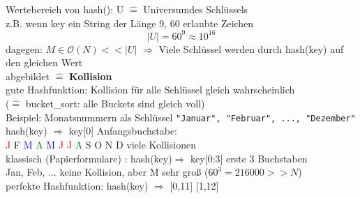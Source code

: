 \documentclass[11pt, fleqn]{scrreprt}
\newcommand{\bigO}[0]{\mathcal{O}}
\begin{document}
Wertebereich von hash(): U $\widehat{=}$ \glqq Universum\grqq des Schlüssels \\
\hspace*{5mm} z.B. wenn key ein String der Länge 9, 60 erlaubte Zeichen \\
\[ |U| = 60^9 \approx 10^{16}\]
dagegen: $M \in \bigO{}(N) << |U|$ $\Rightarrow$ Viele Schlüssel werden durch hash(key) auf den gleichen Wert\\
\hspace*{15mm} abgebildet $\widehat{=}$ \textbf{Kollision}\\
gute Hashfunktion: Kollision für alle Schlüssel gleich wahrscheinlich \\
\hspace*{15mm} ($\widehat{=}$ bucket\_sort: alle Buckets sind gleich voll) \\

Beispiel: Monatsnummern als Schlüssel \verb|"Januar", "Februar", ..., "Dezember"| \\
hash(key) $\Rightarrow$ key[0] Anfangsbuchstabe: \\

\hspace*{10mm} \textcolor{red}{J} \hspace*{5mm}  F \hspace*{5mm}  \textcolor{blue}{M} \hspace*{5mm}  \textcolor{green}{A} \hspace*{5mm}  \textcolor{blue}{M} \hspace*{5mm}  \textcolor{red}{J} \hspace*{5mm}  \textcolor{red}{J} \hspace*{5mm}  \textcolor{green}{A} \hspace*{5mm}
 S \hspace*{5mm}  O \hspace*{5mm}  N \hspace*{5mm}  D \hspace*{10mm} viele Kollisionen \\

klassisch (Papierformulare) : hash(key)$\Rightarrow$ key[0:3] erste 3 Buchstaben\\
\hspace*{5mm} Jan, Feb, ... \hspace*{2.3cm} keine Kollision, aber M sehr groß ($60^3 = 216000 >> N$) \\

perfekte Hashfunktion: hash(key) $\Rightarrow$ [0,11] \hspace*{5mm} [1,12] \\
\end{document}
